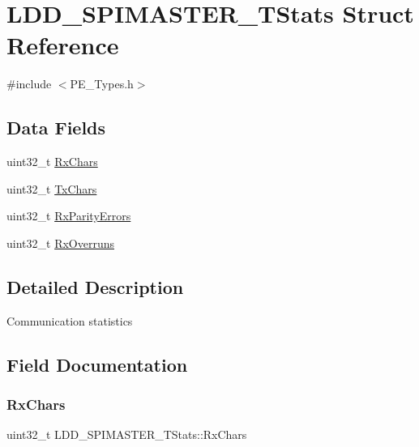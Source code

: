 \hypertarget{struct_l_d_d___s_p_i_m_a_s_t_e_r___t_stats}{}\section{L\+D\+D\+\_\+\+S\+P\+I\+M\+A\+S\+T\+E\+R\+\_\+\+T\+Stats Struct Reference}
\label{struct_l_d_d___s_p_i_m_a_s_t_e_r___t_stats}


{\ttfamily \#include $<$P\+E\+\_\+\+Types.\+h$>$}

\subsection*{Data Fields}
\begin{DoxyCompactItemize}
\item 
uint32\+\_\+t \hyperlink{struct_l_d_d___s_p_i_m_a_s_t_e_r___t_stats_a6faa4c57f364f06f5cd3770a7686ef6f}{Rx\+Chars}
\item 
uint32\+\_\+t \hyperlink{struct_l_d_d___s_p_i_m_a_s_t_e_r___t_stats_af5376883e99d71f857999d58b2888f95}{Tx\+Chars}
\item 
uint32\+\_\+t \hyperlink{struct_l_d_d___s_p_i_m_a_s_t_e_r___t_stats_a83f9f4b7598e6d84e6842539cc54619f}{Rx\+Parity\+Errors}
\item 
uint32\+\_\+t \hyperlink{struct_l_d_d___s_p_i_m_a_s_t_e_r___t_stats_a528cf1d78c49b42ae455ba895987ece5}{Rx\+Overruns}
\end{DoxyCompactItemize}


\subsection{Detailed Description}
Communication statistics 

\subsection{Field Documentation}
\mbox{\label{struct_l_d_d___s_p_i_m_a_s_t_e_r___t_stats_a6faa4c57f364f06f5cd3770a7686ef6f}} 
\subsubsection{\texorpdfstring{Rx\+Chars}{RxChars}}
{\footnotesize\ttfamily uint32\+\_\+t L\+D\+D\+\_\+\+S\+P\+I\+M\+A\+S\+T\+E\+R\+\_\+\+T\+Stats\+::\+Rx\+Chars}

